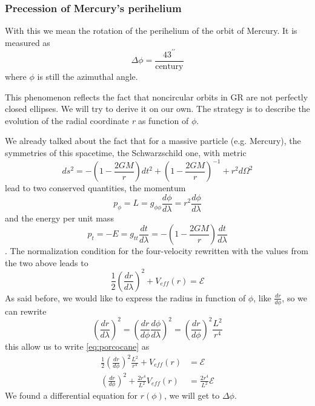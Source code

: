 \subsubsection{Precession of Mercury's perihelium}
With this we mean the rotation of the perihelium of the orbit of Mercury. It is measured as 
\[
\Delta \phi = \frac{43^{\prime \prime }}{\text{century}}
\]
where $\phi $ is still the azimuthal angle. \par
This phenomenon reflects the fact that noncircular orbits in GR are not perfectly closed ellipses. We will try to derive it on our own. The strategy is to describe the evolution of the radial coordinate \emph{r} as function of $\phi $.\par
We already talked about the fact that for a massive particle (e.g. Mercury), the symmetries of this spacetime, the Schwarzschild one, with metric
\[
ds^{2} = -\left( 1- \frac{2GM}{r} \right)dt^{2} + \left( 1- \frac{2GM}{r} \right)^{-1} + r^{2}d\Omega ^{2}
\]
lead to two conserved quantities, the momentum
\begin{equation}
	p_{\phi } = L = g_{\phi \phi } \frac{d \phi }{d \lambda } = r^{2} \frac{d \phi }{d \lambda }
\end{equation}
and the energy per unit mass
\begin{equation}
p_{t} = - E = g_{tt}\frac{d t}{d \lambda } = - \left( 1- \frac{2GM}{r} \right) \frac{d t }{d \lambda }
\end{equation}.
The normalization condition for the four-velocity rewritten with the values from the two above leads to
\begin{equation}\label{eq:porcocane}
\frac{1}{2}\left( \frac{d r}{d \lambda } \right)^{2} + V_{eff}\left( r \right) = \mathcal{E}
\end{equation}
As said before, we would like to express the radius in function of $\phi $, like $\frac{d r}{d \phi }$, so we can rewrite
\begin{equation}
	\left( \frac{d r}{d \lambda } \right) ^{2} = \left( \frac{d r}{d \phi } \frac{d \phi }{d \lambda } \right)^{2} = \left( \frac{d r}{d \phi } \right)^{2} \frac{L^{2}}{r^{4}}
\end{equation}
this allow us to write \ref{eq:porcocane} as 
\begin{align}
	\frac{1}{2} \left( \frac{d r}{d \phi } \right)^{2} \frac{L^{2}}{r^{4}} + V_{eff}\left( r \right) &= \mathcal{E} \label{eq:343}\\
	\left( \frac{d r}{d \phi } \right)^{2} + \frac{2r^{4}}{L^{2}}V_{eff}\left( r \right) &= \frac{2r^{4}}{L^{2}}\mathcal{E}	
\end{align}
We found a differential equation for $r\left( \phi  \right)$, we will get to $\Delta \phi $.
















